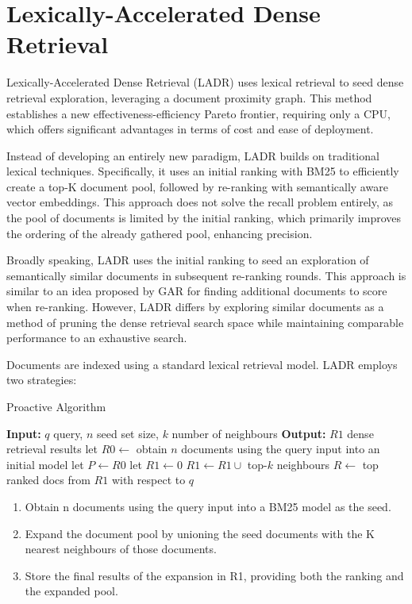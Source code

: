 \documentclass[sigconf,authorversion,nonacm]{acmart}
\begin{document}
\section{Lexically-Accelerated Dense Retrieval}

Lexically-Accelerated Dense Retrieval (LADR)\cite{ladr} uses lexical retrieval to seed dense retrieval
exploration, leveraging a document proximity graph. This method establishes a new
effectiveness-efficiency Pareto frontier, requiring only a CPU, which offers significant advantages
in terms of cost and ease of deployment.

Instead of developing an entirely new paradigm, LADR builds on traditional lexical techniques.
Specifically, it uses an initial ranking with BM25 to efficiently create a top-K document pool,
followed by re-ranking with semantically aware vector embeddings. This approach does not solve the
recall problem entirely, as the pool of documents is limited by the initial ranking, which primarily
improves the ordering of the already gathered pool, enhancing precision.

Broadly speaking, LADR uses the initial ranking to seed an exploration of semantically similar
documents in subsequent re-ranking rounds. This approach is similar to an idea proposed by
GAR\cite{gar} for finding additional documents to score when re-ranking. However, LADR differs by
exploring similar documents as a method of pruning the dense retrieval search space while
maintaining comparable performance to an exhaustive search.

Documents are indexed using a standard lexical retrieval model. LADR employs two strategies:

\begin{algorithm}
	\caption{Proactive Algorithm}
	\begin{algorithmic}[1]
		\STATE \textbf{Input:} \( q \) query, \( n \) seed set size, \( k \) number of neighbours
		\STATE \textbf{Output:} \( R1 \) dense retrieval results
		\STATE let \( R0 \leftarrow \) obtain \( n \) documents using the query input into an initial model
		\STATE let \( P \leftarrow R0 \)
		\STATE let \( R1 \leftarrow 0 \)
		\STATE \( R1 \leftarrow R1 \cup \) top-\( k \) neighbours
		\STATE \( R \leftarrow \) top ranked docs from \( R1 \) with respect to \( q \)
	\end{algorithmic}
\end{algorithm}

\begin{enumerate}

	\item Obtain n documents using the query input into a BM25 model as the seed.
	\item Expand the document pool by unioning the seed documents with the K nearest neighbours of those documents.
	\item Store the final results of the expansion in R1, providing both the ranking and the expanded pool.

\end{enumerate}
\end{document}
